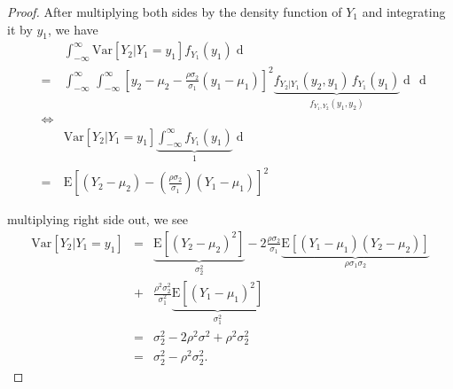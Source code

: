 \documentclass[a4paper, twoside, 11pt]{article}
\theoremstyle{definition}
\newcommand{\sqbr}[1]{\left[ {#1} \right]}
\begin{document}
\begin{proof}
 After multiplying both sides by the density function of $Y_1$ and integrating it by $y_1$, we have
\begin{eqnarray*}
 &\,&\int_{-\infty}^{\infty} \mathrm{Var}[Y_2|Y_1=y_1] f_{Y_1}(y_1) \mathop{dy_1} \\
 &=&\int_{-\infty}^{\infty}\,\int_{-\infty}^{\infty} \sqbr{y_2 - \mu_2 
	- \frac{\rho\sigma_2}{\sigma_1}(y_1-\mu_1)}^2\underbrace{f_{Y_2|Y_1}(y_2, y_1)\,f_{Y_1}(y_1)}_{f_{Y_1, Y_2}(y_1, y_2)} \mathop{dy_2}\,\mathop{dy_1}\\
	&\iff&\\
	&\,&\mathrm{Var}[Y_2|Y_1=y_1] \underbrace{\int_{-\infty}^{\infty}  f_{Y_1}(y_1)}_{1} \mathop{dy_1} \\
	&=& \mathrm{E}\sqbr{(Y_2 - \mu_2) - (\frac{\rho\sigma_2}{\sigma_1})(Y_1 - \mu_1)}^2 
\end{eqnarray*}

multiplying right side out, we see
\begin{eqnarray*}
  \mathrm{Var}[Y_2|Y_1=y_1] &=&\underbrace{\mathrm{E}[(Y_2 - \mu_2)^2]}_{\sigma_2^2} - 2\frac{\rho\sigma_2}{\sigma_1}\underbrace{\mathrm{E}[(Y_1 -\mu_1)(Y_2 - \mu_2)]}_{\rho\sigma_1\sigma_2}\\
  &+& \frac{\rho^2\sigma_2^2}{\sigma_1^2}\underbrace{\mathrm{E}[(Y_1-\mu_1)^2]}_{\sigma_1^2}\\
  &=& \sigma_2^2 - 2\rho^2\sigma^2 + \rho^2\sigma_2^2\\
  &=& \sigma_2^2 - \rho^2\sigma_2^2.
\end{eqnarray*} 
\end{proof}
\end{document}
